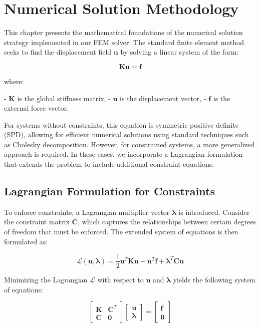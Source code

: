 \chapter{Numerical Solution Methodology}
\label{chap:solver}

This chapter presents the mathematical foundations of the numerical solution strategy implemented in our FEM solver. The standard finite element method seeks to find the displacement field \(\boldsymbol{u}\) by solving a linear system of the form:

\begin{equation}
\mathbf{K} \boldsymbol{u} = \boldsymbol{f}
\end{equation}

where:

- \(\mathbf{K}\) is the global stiffness matrix,
- \(\boldsymbol{u}\) is the displacement vector,
- \(\boldsymbol{f}\) is the external force vector.

For systems without constraints, this equation is symmetric positive definite (SPD), allowing for efficient numerical solutions using standard techniques such as Cholesky decomposition. However, for constrained systems, a more generalized approach is required. In these cases, we incorporate a Lagrangian formulation that extends the problem to include additional constraint equations.

\section{Lagrangian Formulation for Constraints}

To enforce constraints, a Lagrangian multiplier vector \(\boldsymbol{\lambda}\) is introduced. Consider the constraint matrix \(\mathbf{C}\), which captures the relationships between certain degrees of freedom that must be enforced. The extended system of equations is then formulated as:

\begin{equation}
\mathcal{L}(\boldsymbol{u}, \boldsymbol{\lambda}) = \frac{1}{2} \boldsymbol{u}^T \mathbf{K} \boldsymbol{u} - \boldsymbol{u}^T \boldsymbol{f} + \boldsymbol{\lambda}^T \mathbf{C} \boldsymbol{u}
\end{equation}

Minimizing the Lagrangian \(\mathcal{L}\) with respect to \(\boldsymbol{u}\) and \(\boldsymbol{\lambda}\) yields the following system of equations:

\begin{equation}
\begin{bmatrix}
\mathbf{K} & \mathbf{C}^T \\
\mathbf{C} & \mathbf{0}
\end{bmatrix}
\begin{bmatrix}
\boldsymbol{u} \\
\boldsymbol{\lambda}
\end{bmatrix}
=
\begin{bmatrix}
\boldsymbol{f} \\
\boldsymbol{0}
\end{bmatrix}
\end{equation}

